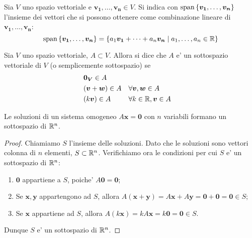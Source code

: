 \begin{definition}
    Sia $V$ uno spazio vettoriale e $\bm{v_1}, \dots, \bm{v_n} \in V$. Si indica con $\operatorname{span}\left\{\bm{v_1}, \dots, \bm{v_n}\right\}$ l'insieme dei vettori che si possono ottenere come combinazione lineare di $\bm{v_1}, \dots, \bm{v_n}$:
    \begin{equation}
        \operatorname{span}\left\{\bm{v_1}, \dots, \bm{v_n}\right\} = \left\{a_1\bm{v_1} + \dots + a_n\bm{v_n} \mid a_1, \dots, a_n \in \mathbb{R}\right\}
    \end{equation}
\end{definition}

\begin{definition}
    Sia $V$ uno spazio vettoriale, $A \subset V$. Allora si dice che $A$ e' un sottospazio vettoriale di $V$ (o semplicemente sottospazio) se
    \begin{align}
        &\bm{0_V} \in A \\
        &(\bm{v} + \bm{w}) \in A    &&\forall \bm{v}, \bm{w} \in A \\
        &(k\bm{v}) \in A            &&\forall k \in \mathbb{R}, \bm{v} \in A
    \end{align}
\end{definition}

\begin{proposition}
    Le soluzioni di un sistema omogeneo $A\bm{x} = \bm{0}$ con $n$ variabili formano un sottospazio di $\mathbb{R}^n$.
\end{proposition}
\begin{proof}
    Chiamiamo $S$ l'insieme delle soluzioni. Dato che le soluzioni sono vettori colonna di $n$ elementi, $S \subset \mathbb{R}^n$. Verifichiamo ora le condizioni per cui $S$ e' un sottospazio di $\mathbb{R}^n$:
    \begin{enumerate}
        \item $\bm{0}$ appartiene a $S$, poiche' $A\bm{0} = \bm{0}$;
        \item Se $\bm{x}, \bm{y}$ appartengono ad $S$, allora $A(\bm{x} + \bm{y}) = A\bm{x} + A\bm{y} = \bm{0} + \bm{0} = \bm{0} \in S$;
        \item Se $\bm{x}$ appartiene ad $S$, allora $A(k\bm{x}) = kA\bm{x} = k\bm{0} = \bm{0} \in S$.
    \end{enumerate}
    Dunque $S$ e' un sottospazio di $\mathbb{R}^n$.
\end{proof}

